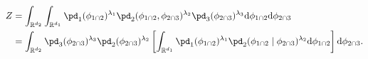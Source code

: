 \begin{align}
Z &=
  \int_{\mathbb{R}^{d_{2}}}
  \int_{\mathbb{R}^{d_{1}}} 
    \pd_{1}(\phi_{1 \cap 2})^{\lambda_{1}} 
    \pd_{2}(\phi_{1 \cap 2}, \phi_{2 \cap 3})^{\lambda_{2}}
    \pd_{3}(\phi_{2 \cap 3})^{\lambda_{3}}
  \text{d}\phi_{1 \cap 2}
  \text{d}\phi_{2 \cap 3}   \label{eqn:int-pooled-prior-overall-corrected-1} \\
  &=
  \int_{\mathbb{R}^{d_{2}}}
    \pd_{3}(\phi_{2 \cap 3})^{\lambda_{3}}
    \pd_{2}(\phi_{2 \cap 3})^{\lambda_{2}}
  \left[\int_{\mathbb{R}^{d_{1}}} 
    \pd_{1}(\phi_{1 \cap 2})^{\lambda_{1}} 
    \pd_{2}(\phi_{1 \cap 2} \mid \phi_{2 \cap 3})^{\lambda_{2}}  
  \text{d}\phi_{1 \cap 2}
  \right]
  \text{d}\phi_{2 \cap 3}.
     \label{eqn:int-pooled-prior-overall-corrected-2}
\end{align}